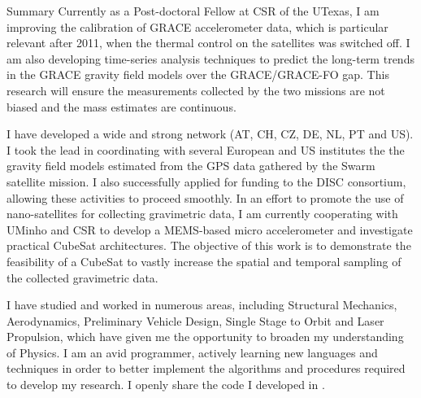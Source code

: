 \begin{cvtext}{Summary}
Currently as a Post-doctoral Fellow at \ac{CSR} of the \ac{UTexas}, I am improving the calibration of \ac{GRACE} accelerometer data, which is particular relevant after 2011, when the thermal control on the satellites was switched off.
I am also developing time-series analysis techniques to predict the long-term trends in the \ac{GRACE} gravity field models over the \ac{GRACE}/\ac{GRACE-FO} gap.
This research will ensure the measurements collected by the two missions are not biased and the mass estimates are continuous.

I have developed a wide and strong network (AT, CH, CZ, DE, NL, PT and US).
I took the lead in coordinating with several European and US institutes the  the gravity field models estimated from the \ac{GPS} data gathered by the Swarm satellite mission.
I also successfully applied for funding to the \ac{DISC} consortium, allowing these activities to proceed smoothly.
In an effort to promote the use of nano-satellites for collecting gravimetric data, I am currently cooperating with \ac{UMinho} and CSR to develop a \ac{MEMS}-based micro accelerometer and investigate practical CubeSat architectures.
The objective of this work is to demonstrate the feasibility of a CubeSat to vastly increase the spatial and temporal sampling of the collected gravimetric data.

I have studied and worked in numerous areas, including Structural Mechanics, Aerodynamics, Preliminary Vehicle Design, Single Stage to Orbit and Laser Propulsion, which have given me the opportunity to broaden my understanding of Physics.
I am an avid programmer, actively learning new languages and techniques in order to better implement the algorithms and procedures required to develop my research.
I openly share the code I developed in .

\end{cvtext}